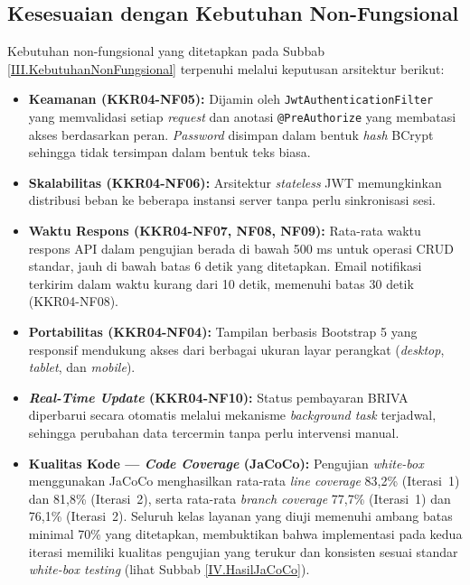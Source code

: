 \subsection{Kesesuaian dengan Kebutuhan Non-Fungsional} \label{IV.AnalisisNonFungsional}

Kebutuhan non-fungsional yang ditetapkan pada Subbab \ref{III.KebutuhanNonFungsional} terpenuhi melalui keputusan arsitektur berikut:\par

\begin{itemize}[noitemsep]
	\item \textbf{Keamanan (KKR04-NF05):} Dijamin oleh \texttt{JwtAuthenticationFilter} yang memvalidasi setiap \textit{request} dan anotasi \texttt{@PreAuthorize} yang membatasi akses berdasarkan peran. \textit{Password} disimpan dalam bentuk \textit{hash} BCrypt sehingga tidak tersimpan dalam bentuk teks biasa.
	\item \textbf{Skalabilitas (KKR04-NF06):} Arsitektur \textit{stateless} JWT memungkinkan distribusi beban ke beberapa instansi server tanpa perlu sinkronisasi sesi.
	\item \textbf{Waktu Respons (KKR04-NF07, NF08, NF09):} Rata-rata waktu respons API dalam pengujian berada di bawah 500 ms untuk operasi CRUD standar, jauh di bawah batas 6 detik yang ditetapkan. Email notifikasi terkirim dalam waktu kurang dari 10 detik, memenuhi batas 30 detik (KKR04-NF08).
	\item \textbf{Portabilitas (KKR04-NF04):} Tampilan berbasis Bootstrap 5 yang responsif mendukung akses dari berbagai ukuran layar perangkat (\textit{desktop}, \textit{tablet}, dan \textit{mobile}).
	\item \textbf{\textit{Real-Time Update} (KKR04-NF10):} Status pembayaran BRIVA diperbarui secara otomatis melalui mekanisme \textit{background task} terjadwal, sehingga perubahan data tercermin tanpa perlu intervensi manual.
	\item \textbf{Kualitas Kode --- \textit{Code Coverage} (JaCoCo):} Pengujian \textit{white-box} menggunakan JaCoCo menghasilkan rata-rata \textit{line coverage} 83{,}2\% (Iterasi~1) dan 81{,}8\% (Iterasi~2), serta rata-rata \textit{branch coverage} 77{,}7\% (Iterasi~1) dan 76{,}1\% (Iterasi~2). Seluruh kelas layanan yang diuji memenuhi ambang batas minimal 70\% yang ditetapkan, membuktikan bahwa implementasi pada kedua iterasi memiliki kualitas pengujian yang terukur dan konsisten sesuai standar \textit{white-box testing} (lihat Subbab \ref{IV.HasilJaCoCo}).
\end{itemize}

